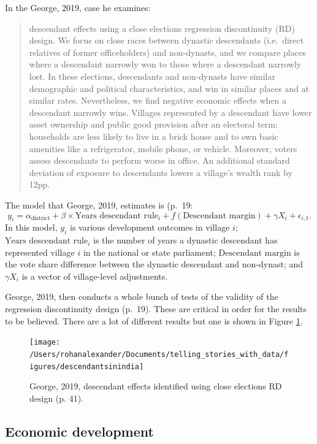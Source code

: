 \documentclass[
]{book}
\begin{document}
In the George, 2019, case he examines:

\begin{quote}
descendant effects using a close elections regression discontinuity (RD) design. We focus on close races between dynastic descendants (i.e.~direct relatives of former officeholders) and non-dynasts, and we compare places where a descendant narrowly won to those where a descendant narrowly lost. In these elections, descendants and non-dynasts have similar demographic and political characteristics, and win in similar places and at similar rates. Nevertheless, we find negative economic effects when a descendant narrowly wins. Villages represented by a descendant have lower asset ownership and public good provision after an electoral term: households are less likely to live in a brick house and to own basic amenities like a refrigerator, mobile phone, or vehicle. Moreover, voters assess descendants to perform worse in office. An additional standard deviation of exposure to descendants lowers a village's wealth rank by 12pp.
\end{quote}

The model that George, 2019, estimates is (p.~19:
\[y_i = \alpha_{\mbox{district}} + \beta \times \mbox{Years descendant rule}_i + f(\mbox{Descendant margin}) + \gamma X_i + \epsilon_{i,t}.\]
In this model, \(y_i\) is various development outcomes in village \(i\); \(\mbox{Years descendant rule}_i\) is the number of years a dynastic descendant has represented village \(i\) in the national or state parliament; \(\mbox{Descendant margin}\) is the vote share difference between the dynastic descendant and non-dynast; and \(\gamma X_i\) is a vector of village-level adjustments.

George, 2019, then conducts a whole bunch of tests of the validity of the regression discontinuity design (p.~19). These are critical in order for the results to be believed. There are a lot of different results but one is shown in Figure \ref{fig:descendantsinindia}.

\begin{figure}
\texttt{[image: /Users/rohanalexander/Documents/telling\_stories\_with\_data/figures/descendantsinindia]} \caption{George, 2019, descendant effects identified using close elections RD design (p. 41).}\label{fig:descendantsinindia}
\end{figure}

\hypertarget{economic-development}{%
\subsection{Economic development}\label{economic-development}}
\end{document}
